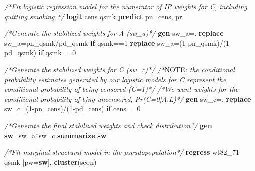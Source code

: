 \documentclass[
  10pt,
]{book}
\newenvironment{Shaded}{\begin{snugshade}}{\end{snugshade}}
\newcommand{\AlertTok}[1]{\textcolor[rgb]{0.94,0.16,0.16}{#1}}
\newcommand{\CommentTok}[1]{\textcolor[rgb]{0.56,0.35,0.01}{\textit{#1}}}
\newcommand{\KeywordTok}[1]{\textcolor[rgb]{0.13,0.29,0.53}{\textbf{#1}}}
\newcommand{\NormalTok}[1]{#1}
\begin{document}
\begin{Shaded}
\begin{Highlighting}[]
\CommentTok{/*Fit logistic regression model for the  numerator of IP weights for C, including quitting smoking */}
\KeywordTok{logit}\NormalTok{ cens qsmk}
\KeywordTok{predict}\NormalTok{ pn\_cens, pr}

\CommentTok{/*Generate the stabilized weights for A (sw\_a)*/}
\KeywordTok{gen}\NormalTok{ sw\_a=.}
\KeywordTok{replace}\NormalTok{ sw\_a=pn\_qsmk/pd\_qsmk }\KeywordTok{if}\NormalTok{ qsmk==1}
\KeywordTok{replace}\NormalTok{ sw\_a=(1{-}pn\_qsmk)/(1{-}pd\_qsmk) }\KeywordTok{if}\NormalTok{ qsmk==0}

\CommentTok{/*Generate the stabilized weights for C (sw\_c)*/}
\CommentTok{/*}\AlertTok{NOTE}\CommentTok{: the conditional probability estimates generated by our logistic models for C represent the conditional probability of being censored (C=1)*/}
\CommentTok{/*We want weights for the conditional probability of bing uncensored, Pr(C=0|A,L)*/}
\KeywordTok{gen}\NormalTok{ sw\_c=.}
\KeywordTok{replace}\NormalTok{ sw\_c=(1{-}pn\_cens)/(1{-}pd\_cens) }\KeywordTok{if}\NormalTok{ cens==0}

\CommentTok{/*Generate the final stabilized weights and check distribution*/}
\KeywordTok{gen} \KeywordTok{sw}\NormalTok{=sw\_a*sw\_c}
\KeywordTok{summarize} \KeywordTok{sw}

\CommentTok{/*Fit marginal structural model in the pseudopopulation*/}
\KeywordTok{regress}\NormalTok{ wt82\_71 qsmk [pw=}\KeywordTok{sw}\NormalTok{], }\KeywordTok{cluster}\NormalTok{(seqn)}
\end{Highlighting}
\end{Shaded}
\end{document}
